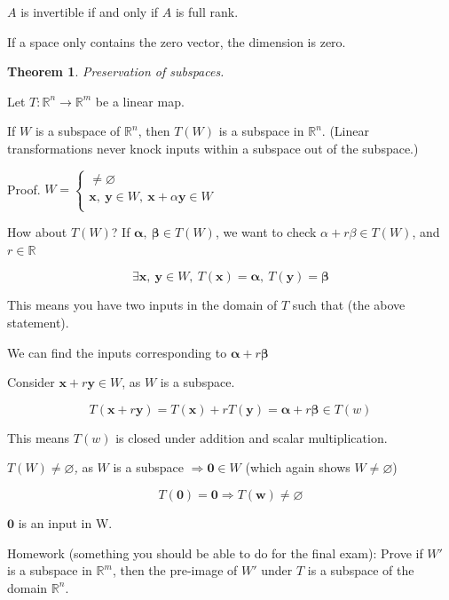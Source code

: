 \documentclass[12pt]{article}
\theoremstyle{plain}
\newtheorem{theorem}{Theorem}[section]
\theoremstyle{remark}
\theoremstyle{definition}
\begin{document}
\(A\) is invertible if and only if \(A\) is full rank.

If a space only contains the zero vector, the dimension is zero.

\begin{theorem}
Preservation of subspaces.
\end{theorem}

Let \(T:\mathbb{R}^{n} \rightarrow \mathbb{R}^{m}\) be a linear map.

If \(W\) is a subspace of \(\mathbb{R}^{n}\), then \(T(W)\) is a
subspace in \(\mathbb{R}^{n}\). (Linear transformations never knock
inputs within a subspace out of the subspace.)

Proof. \(W = \left\{ \begin{matrix}
 \neq \varnothing \\
\mathbf{x},\ \mathbf{y} \in W,\ \mathbf{x} + \alpha\mathbf{y} \in W \\
\end{matrix} \right.\ \)

How about \(T(W)\)? If
\(\mathbf{\alpha},\ \mathbf{\beta} \in T(W)\), we want to check
\(\alpha + r\beta \in T(W)\), and \(r\mathbb{\in R}\)

\[\exists\mathbf{x},\ \mathbf{y} \in W,\ T\left( \mathbf{x} \right) = \mathbf{\alpha},\ T\left( \mathbf{y} \right) = \mathbf{\beta}\]

This means you have two inputs in the domain of \(T\) such that (the
above statement).

We can find the inputs corresponding to
\(\mathbf{\alpha} + r\mathbf{\beta}\)

Consider \(\mathbf{x} + r\mathbf{y} \in W\), as \(W\) is a
subspace.

\[T\left( \mathbf{x} + r\mathbf{y} \right) = T\left( \mathbf{x} \right) + rT\left( \mathbf{y} \right) = \mathbf{\alpha} + r\mathbf{\beta} \in T(w)\]

This means \(T(w)\) is closed under addition and scalar multiplication.

\(T(W) \neq \varnothing\)\emph{,} as \(W\) is a subspace
\(\Rightarrow \mathbf{0} \in W\) (which again shows
\(W \neq \varnothing\))

\[T\left( \mathbf{0} \right) = \mathbf{0} \Rightarrow T(\mathbf{w}) \neq \varnothing\]

\(\mathbf{0}\) is an input in W.

Homework (something you should be able to do for the final exam): Prove
if \(W'\) is a subspace in \(\mathbb{R}^{m}\), then the pre-image of
\(W'\) under \(T\) is a subspace of the domain \(\mathbb{R}^{n}\).
\end{document}
